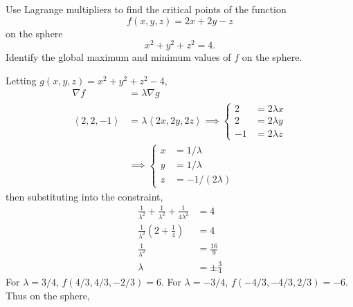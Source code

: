 \documentclass[12pt,answers]{exam}
\newcommand{\vect}[1]{\left\langle #1\right\rangle}
\begin{document}
\begin{questions}
	\newpage
	\question[15]
	Use Lagrange multipliers to find the critical points of the function
	\[
		f(x,y,z) = 2x + 2y - z
	\]
	on the sphere
	\[
		x^2 + y^2 + z^2 = 4.
	\]
	Identify the global maximum and minimum values of $f$ on the sphere.
	\begin{solution}
		Letting $g(x,y,z) = x^2+y^2+z^2-4$,
		\begin{align*}
			\nabla f &= \lambda \nabla g \\
			\vect{2,2,-1} &= \lambda \vect{2x,2y,2z}
			\implies
			\left\{
				\begin{aligned}
					2 &= 2\lambda x\\
					2 &= 2\lambda y\\
					-1 &= 2\lambda z
				\end{aligned}
			\right.\\
			&\implies
			\left\{
			\begin{aligned}
				x &= 1/\lambda \\
				y &= 1/\lambda \\
				z &= -1/(2\lambda)
			\end{aligned}
			\right.
		\end{align*}
		then substituting into the constraint,
		\begin{align*}
			\frac{1}{\lambda^2} + \frac{1}{\lambda^2} + \frac{1}{4\lambda^2} &= 4 \\
			\frac{1}{\lambda^2}(2 + \frac14) &= 4 \\
			\frac{1}{\lambda^2} &= \frac{16}{9} \\
			\lambda &= \pm \frac{3}{4}
		\end{align*}
		For $\lambda = 3/4$, $f(4/3, 4/3, -2/3) = 6$.
		For $\lambda = -3/4$, $f(-4/3, -4/3, 2/3) = -6$.
		Thus on the sphere, 
	\end{solution}
\end{questions}
\end{document}
